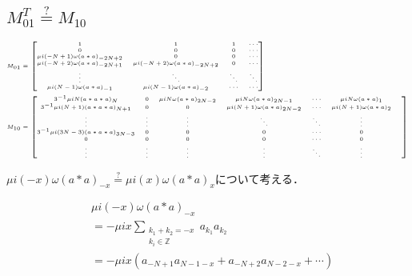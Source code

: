 \documentclass[11pt,a4paper]{jsarticle}
\theoremstyle{definition}
\begin{document}
\subsection*{$M_{01}^T \stackrel{\mathrm{?}}{=} M_{10}$}
\begin{equation}
  \tiny
  \begin{split}
    &M_{01}
    =\begin{bmatrix}
      1 & 1 & 1 & \cdots\\
      0 & 0 & 0 & \cdots\\
      \mu i (-N+1) \omega (a*a)_{-2N+2} & 0 & 0 & \cdots\\
      \mu i (-N+2) \omega (a*a)_{-2N+1} & \mu i (-N+2) \omega (a*a)_{-2N+2} & 0 & \cdots \\
      \vdots & \ddots & \ddots & \ddots \\
      \mu i (N-1) \omega (a*a)_{-1} & \mu i (N-1) \omega (a*a)_{-2}  & \cdots & \cdots
    \end{bmatrix}\\
    &M_{10}
    = \begin{bmatrix}
      3^{-1}\mu i N (a*a*a)_{N} & 0 & \mu i N \omega (a*a)_{2N-2} & \mu i N \omega (a*a)_{2N-1} & \cdots & \mu i N \omega (a*a)_1 &\\
      3^{-1}\mu i (N+1) (a*a*a)_{N+1} & 0 & 0 & \mu i (N+1) \omega (a*a)_{2N-2} & \cdots & \mu i (N+1) \omega (a*a)_2 &\\
      \vdots & \vdots & \vdots & \ddots & \ddots & \vdots\\
      3^{-1}\mu i (3N-3) (a*a*a)_{3N-3}  & 0 & 0 & 0 & \cdots & 0\\
      0 & 0 & 0 & 0 & \cdots & 0 \\
      \vdots & \vdots & \vdots & \vdots & \ddots & \vdots\\
    \end{bmatrix}
  \end{split}
\end{equation}

$\mu i (-x) \omega (a*a)_{-x} \stackrel{\mathrm{?}}{=} \mu i (x) \omega (a*a)_{x}$について考える．

\begin{equation}
  \begin{split}
    &\mu i (-x) \omega (a*a)_{-x}\\
    &= -\mu ix \sum_{\substack{k_1+k_2=-x \\ k_i\in\mathbb{Z}}} a_{k_1}a_{k_2}\\
    &= -\mu ix (a_{-N+1}a_{N-1-x}+a_{-N+2}a_{N-2-x}+\cdots)
  \end{split}
\end{equation}
\end{document}

